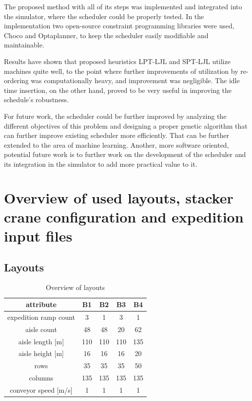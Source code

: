 \documentclass{ctuthesis}
\begin{document}
The proposed method with all of its steps was implemented and integrated into the simulator, where the scheduler could be properly tested. In the implementation two open-source constraint programming libraries were used, Choco and Optaplanner, to keep the scheduler easily modifiable and maintainable.

Results have shown that proposed heuristics LPT-LJL and SPT-LJL utilize machines quite well, to the point where further improvements of utilization by re-ordering was computationally heavy, and improvement was negligible. The idle time insertion, on the other hand, proved to be very useful in improving the schedule's robustness. 

For future work, the scheduler could be further improved by analyzing the different objectives of this problem and designing a proper genetic algorithm that can further improve existing scheduler more efficiently. That can be further extended to the area of machine learning. Another, more software oriented, potential future work is to further work on the development of the scheduler and its integration in the simulator to add more practical value to it.






\appendix

\chapter{Overview of used layouts, stacker crane configuration and expedition input files}

\section{Layouts}

\begin{table}[H]
\begin{tabular}{ |c|| c | c | c | c |} 
\hline
attribute & B1 & B2 & B3 & B4\\ 
\hline
expedition ramp count & 3 & 1 & 3 & 1 \\
\hline
aisle count & 48 & 48 & 20 & 62\\
\hline
aisle length [m] &  110 & 110 & 110 & 135\\
\hline
aisle height [m] & 16 & 16 & 16 & 20\\
\hline
rows & 35 & 35 & 35 & 50\\ 
\hline
columns & 135 & 135 & 135 & 135\\ 
\hline
conveyor speed [m/s] & 1 & 1 & 1 & 1\\ 
\hline
\end{tabular}
\caption{Overview of layouts} \label{tab:layoutoverview}
\end{table}
\end{document}
